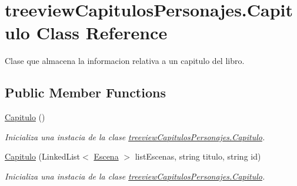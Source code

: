 \hypertarget{classtreeview_capitulos_personajes_1_1_capitulo}{\section{treeview\-Capitulos\-Personajes.\-Capitulo Class Reference}
\label{classtreeview_capitulos_personajes_1_1_capitulo}
}


Clase que almacena la informacion relativa a un capitulo del libro.  


\subsection*{Public Member Functions}
\begin{DoxyCompactItemize}
\item 
\hyperlink{classtreeview_capitulos_personajes_1_1_capitulo_a4f6055822626bff54cfda3500ea3b3ec}{Capitulo} ()
\begin{DoxyCompactList}\small\item\em Inicializa una instacia de la clase \hyperlink{classtreeview_capitulos_personajes_1_1_capitulo}{treeview\-Capitulos\-Personajes.\-Capitulo}. \end{DoxyCompactList}\item 
\hyperlink{classtreeview_capitulos_personajes_1_1_capitulo_ab4ccdc6090862a7578405bad585878db}{Capitulo} (Linked\-List$<$ \hyperlink{classtreeview_capitulos_personajes_1_1_escena}{Escena} $>$ list\-Escenas, string titulo, string id)
\begin{DoxyCompactList}\small\item\em Inicializa una instacia de la clase \hyperlink{classtreeview_capitulos_personajes_1_1_capitulo}{treeview\-Capitulos\-Personajes.\-Capitulo}. \end{DoxyCompactList}\end{DoxyCompactItemize}
